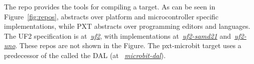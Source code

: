 The repo \emph{\href{https://github.com/lancaster-university/codal}{\COLN}} provides the
tools for compiling a \CO target.  As can be seen in Figure~\ref{fig:repos},
\CO abstracts over platform and microcontroller specific
implementations, while PXT abstracts over programming editors and languages.
The UF2 specification is at~\emph{\href{https://github.com/microsoft/uf2}{uf2}},
with implementations at~\emph{\href{https://github.com/microsoft/uf2-samd21}{uf2-samd21}}
and~\emph{\href{https://github.com/mmoskal/uf2-uno}{uf2-uno}}. These repos are not
shown in the Figure.
The pxt-microbit target uses a predecessor of the \CO called the DAL (at
~\emph{\href{https://github.com/lancaster-university/microbit-dal}{microbit-dal}}).
